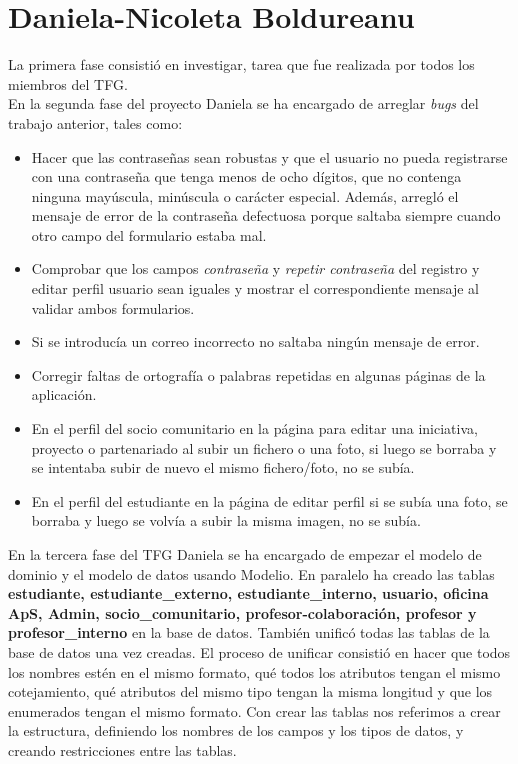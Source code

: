 \documentclass[11pt]{book}
\begin{document}
\section{Daniela-Nicoleta Boldureanu}
La primera fase consistió en investigar, tarea que fue realizada por todos los miembros del TFG.\\
En la segunda fase del proyecto Daniela se ha encargado de arreglar \textit{bugs} del trabajo anterior, tales como:
\begin{itemize} 
	\item Hacer que las contraseñas sean robustas y que el usuario no pueda registrarse con una contraseña que tenga menos de ocho dígitos, que no contenga ninguna mayúscula, minúscula o carácter especial. Además, arregló el mensaje de error de la contraseña defectuosa porque saltaba siempre cuando otro campo del formulario estaba mal.
	\item Comprobar que los campos \emph{contraseña} y \emph{repetir contraseña} del registro y editar perfil usuario sean iguales y mostrar el correspondiente mensaje al validar ambos formularios.
	\item Si se introducía un correo incorrecto no saltaba ningún mensaje de error.
	\item Corregir faltas de ortografía o palabras repetidas en algunas páginas de la aplicación.
	\item En el perfil del socio comunitario en la página para editar una iniciativa, proyecto o partenariado al subir un fichero o una foto, si luego se borraba y se intentaba subir de nuevo el mismo fichero/foto, no se subía.
	\item En el perfil del estudiante en la página de editar perfil si se subía una foto, se borraba y luego se volvía a subir la misma imagen, no se subía.
\end{itemize}
En la tercera fase del TFG Daniela se ha encargado de empezar el modelo de dominio y el modelo de datos usando Modelio. En paralelo ha creado las tablas \textbf{estudiante, estudiante\_externo, estudiante\_interno, usuario, oficina ApS, Admin, socio\_comunitario, profesor-colaboración, profesor y profesor\_interno} en la base de datos. También unificó todas las tablas de la base de datos una vez creadas. El proceso de unificar consistió en hacer que todos los nombres estén en el mismo formato, qué todos los atributos tengan el mismo cotejamiento, qué atributos del mismo tipo tengan la misma longitud y que los enumerados tengan el mismo formato. Con crear las tablas nos referimos a crear la estructura, definiendo los nombres de los campos y los tipos de datos, y creando restricciones entre las tablas.\\\\
\end{document}
